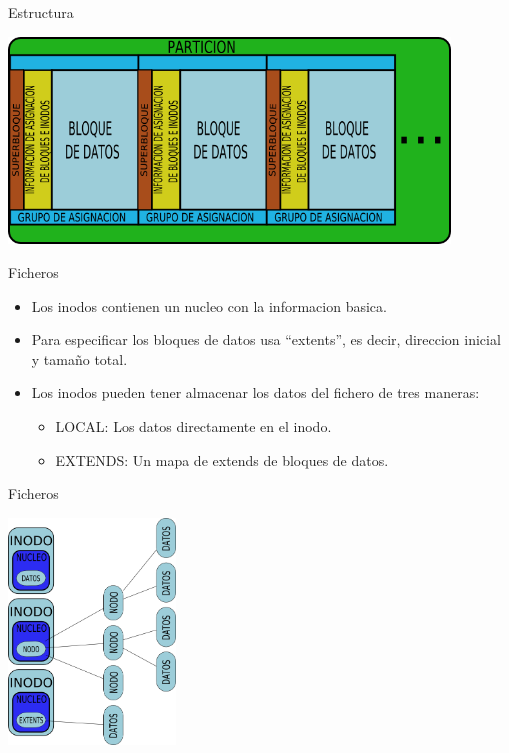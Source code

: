 \begin{frame}{Estructura}
  \begin{center}
    \includegraphics[height=5.5cm]{imgs/xfs_struct.png}
  \end{center}
\end{frame}

\begin{frame}{Ficheros}
  \begin{itemize}
    \item Los inodos contienen un nucleo con la informacion basica.
    \item Para especificar los bloques de datos usa “extents”, es decir, direccion inicial y tamaño total.
    \item Los inodos pueden tener almacenar los datos del fichero de tres maneras:
    \begin{itemize}
      \item LOCAL: Los datos directamente en el inodo.
      \item EXTENDS: Un mapa de extends de bloques de datos.
    \end{itemize}
  \end{itemize}
\end{frame}

\begin{frame}{Ficheros}
  \begin{center}
    \includegraphics[height=6cm]{imgs/xfs_files.png}
  \end{center}
\end{frame}
